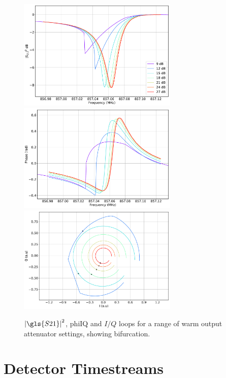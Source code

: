 \begin{figure}[!ptbh]
\centering
\caption[~Sweeps at different tone powers for a single resonator, showing bifurcation.]{$\left| \gls{S21} \right|^{2}$, \gls{phiIQ} and $I/Q$ loops for a range of warm output attenuator settings, showing bifurcation.}
\includegraphics[width=0.68\textwidth]{figures/blast_data/sweeps/mag_tone_power_bifurc}
\includegraphics[width=0.68\textwidth]{figures/blast_data/sweeps/phase_tone_power_bifurc}
\includegraphics[width=0.68\textwidth]{figures/blast_data/sweeps/IQ_tone_power_bifurc}
\label{fig:may out atten bifurc}
\end{figure}

\section{Detector Timestreams}\label{timestreams}

